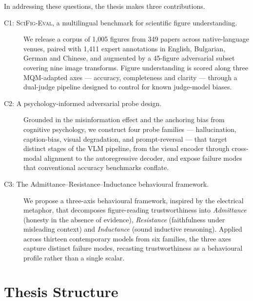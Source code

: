In addressing these questions, the thesis makes three contributions.

\begin{description}
\item[C1: \textsc{SciFig-Eval}, a multilingual benchmark for
  scientific figure understanding.] We release a corpus of 1{,}005
  figures from 349 papers across native-language venues, paired with 1{,}411 expert
  annotations in English, Bulgarian, German and Chinese, and
  augmented by a 45-figure adversarial subset covering nine image
  transforms. Figure understanding is scored along three
  MQM-adapted axes --- accuracy, completeness and clarity ---
  through a dual-judge pipeline designed to control for known
  judge-model biases.

\item[C2: A psychology-informed adversarial probe design.] Grounded
  in the misinformation effect and the anchoring bias from cognitive
  psychology, we construct four probe families --- hallucination,
  caption-bias, visual degradation, and prompt-reversal ---
  that target distinct stages of the VLM pipeline, from the visual
  encoder through cross-modal alignment to the autoregressive
  decoder, and expose failure modes that conventional accuracy
  benchmarks conflate.

\item[C3: The Admittance--Resistance--Inductance behavioural
  framework.] We propose a three-axis behavioural framework,
  inspired by the electrical metaphor, that decomposes figure-reading
  trustworthiness into \emph{Admittance} (honesty in the absence of
  evidence), \emph{Resistance} (faithfulness under misleading
  context) and \emph{Inductance} (sound inductive reasoning).
  Applied across thirteen contemporary models from six families, the
  three axes capture distinct failure modes, recasting trustworthiness as a
  behavioural profile rather than a single scalar.
\end{description}

\section{Thesis Structure}
\label{sec:intro-structure}

